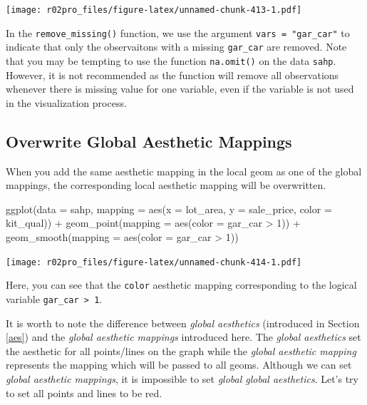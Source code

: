 \documentclass[
]{book}
\newenvironment{Shaded}{\begin{snugshade}}{\end{snugshade}}
\newcommand{\AttributeTok}[1]{\textcolor[rgb]{0.77,0.63,0.00}{#1}}
\newcommand{\DecValTok}[1]{\textcolor[rgb]{0.00,0.00,0.81}{#1}}
\newcommand{\FunctionTok}[1]{\textcolor[rgb]{0.00,0.00,0.00}{#1}}
\newcommand{\NormalTok}[1]{#1}
\newcommand{\SpecialCharTok}[1]{\textcolor[rgb]{0.00,0.00,0.00}{#1}}
\begin{document}
\texttt{[image: r02pro\_files/figure-latex/unnamed-chunk-413-1.pdf]}

In the \texttt{remove\_missing()} function, we use the argument \texttt{vars\ =\ "gar\_car"} to indicate that only the observaitons with a missing \texttt{gar\_car} are removed. Note that you may be tempting to use the function \texttt{na.omit()} on the data \texttt{sahp}. However, it is not recommended as the function will remove all observations whenever there is missing value for one variable, even if the variable is not used in the visualization process.

\hypertarget{overwrite-global-aesthetic-mappings}{%
\subsection{Overwrite Global Aesthetic Mappings}\label{overwrite-global-aesthetic-mappings}}

When you add the same aesthetic mapping in the local geom as one of the global mappings, the corresponding local aesthetic mapping will be overwritten.

\begin{Shaded}
\begin{Highlighting}[]
\FunctionTok{ggplot}\NormalTok{(}\AttributeTok{data =}\NormalTok{ sahp, }\AttributeTok{mapping =} \FunctionTok{aes}\NormalTok{(}\AttributeTok{x =}\NormalTok{ lot\_area, }\AttributeTok{y =}\NormalTok{ sale\_price, }\AttributeTok{color =}\NormalTok{ kit\_qual)) }\SpecialCharTok{+} \FunctionTok{geom\_point}\NormalTok{(}\AttributeTok{mapping =} \FunctionTok{aes}\NormalTok{(}\AttributeTok{color =}\NormalTok{ gar\_car }\SpecialCharTok{\textgreater{}} \DecValTok{1}\NormalTok{)) }\SpecialCharTok{+} \FunctionTok{geom\_smooth}\NormalTok{(}\AttributeTok{mapping =} \FunctionTok{aes}\NormalTok{(}\AttributeTok{color =}\NormalTok{ gar\_car }\SpecialCharTok{\textgreater{}} \DecValTok{1}\NormalTok{))}
\end{Highlighting}
\end{Shaded}

\texttt{[image: r02pro\_files/figure-latex/unnamed-chunk-414-1.pdf]}

Here, you can see that the \texttt{color} aesthetic mapping corresponding to the logical variable \texttt{gar\_car\ \textgreater{}\ 1}.

It is worth to note the difference between \emph{global aesthetics} (introduced in Section \ref{aes}) and the \emph{global aesthetic mappings} introduced here. The \emph{global aesthetics} set the aesthetic for all points/lines on the graph while the \emph{global aesthetic mapping} represents the mapping which will be passed to all geoms. Although we can set \emph{global aesthetic mappings}, it is impossible to set \emph{global global aesthetics}. Let's try to set all points and lines to be red.
\end{document}
